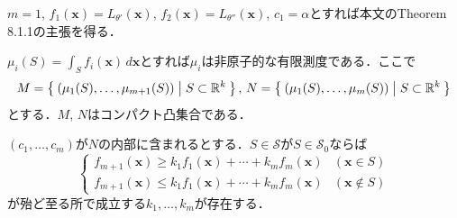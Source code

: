 \(m=1\), \(f_1(\boldsymbol{x})=L_{\theta'}(\boldsymbol{x})\), \(f_2(\boldsymbol{x})=L_{\theta''}(\boldsymbol{x})\), \(c_1=\alpha\)とすれば本文のTheorem 8.1.1の主張を得る．

\(\mu_i(S) = \int_S f_i(\boldsymbol{x}) \, d\boldsymbol{x}\)とすれば\(\mu_i\)は非原子的な有限測度である．ここで
\[
M = \Set{(\mu_1(S), \ldots, \mu_{m+1}(S)) | S \subset \mathbb{R}^k} , \,
N = \Set{(\mu_1(S), \ldots, \mu_m(S)) | S \subset \mathbb{R}^k}
\]
とする．\(M\), \(N\)はコンパクト凸集合である．

\begin{screen}
  \begin{thm}
    \((c_1, \ldots, c_m)\)が\(N\)の内部に含まれるとする．\(S\in\mathcal{S}\)が\(S\in\mathcal{S}_0\)ならば
    \[
    \begin{cases}
      f_{m+1}(\boldsymbol{x}) \geq k_1 f_1(\boldsymbol{x}) + \cdots + k_m f_m(\boldsymbol{x}) & (\boldsymbol{x} \in S) \\
      f_{m+1}(\boldsymbol{x}) \leq k_1 f_1(\boldsymbol{x}) + \cdots + k_m f_m(\boldsymbol{x}) & (\boldsymbol{x} \not\in S)
    \end{cases}
    \]
    が殆ど至る所で成立する\(k_1, \ldots, k_m\)が存在する．
  \end{thm}
\end{screen}
